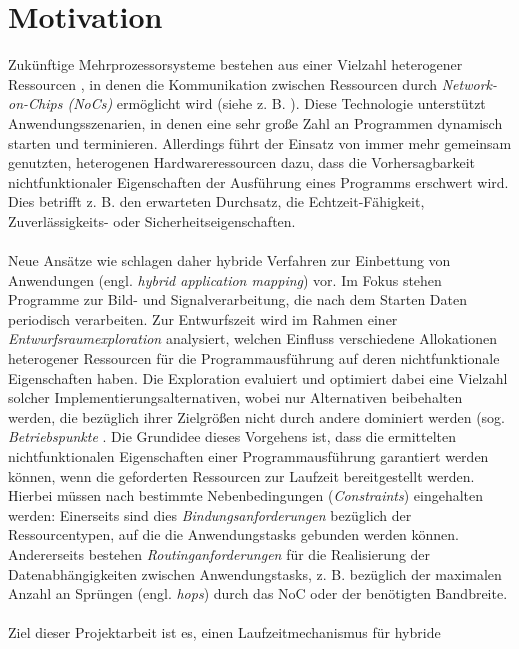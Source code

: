 \chapter{Motivation}\label{motivation}
Zukünftige Mehrprozessorsysteme bestehen aus einer Vielzahl heterogener
Ressourcen \cite{thousandCoreChips}, in denen die Kommunikation zwischen Ressourcen
durch \textit{Network-on-Chips (NoCs)} ermöglicht wird (siehe z. B. \cite{mappingNocArchitectures}). Diese Technologie
unterstützt Anwendungsszenarien, in denen eine sehr große Zahl an Programmen
dynamisch starten und terminieren. Allerdings führt der Einsatz von
immer mehr gemeinsam genutzten, heterogenen Hardwareressourcen dazu, dass
die Vorhersagbarkeit nichtfunktionaler Eigenschaften der Ausführung eines Programms
erschwert wird. Dies betrifft z. B. den erwarteten Durchsatz, die Echtzeit-Fähigkeit, Zuverlässigkeits- oder Sicherheitseigenschaften.\\
\\
Neue Ansätze wie \cite{reconfigurableArchtictures} \cite{daarm} schlagen daher hybride Verfahren zur Einbettung von
Anwendungen (engl. \textit{hybrid application mapping}) vor. Im Fokus stehen Programme
zur Bild- und Signalverarbeitung, die nach dem Starten Daten periodisch
verarbeiten. Zur Entwurfszeit wird im Rahmen einer \textit{Entwurfsraumexploration} analysiert, welchen Einfluss verschiedene Allokationen heterogener
Ressourcen für die Programmausführung auf deren nichtfunktionale Eigenschaften
haben. Die Exploration evaluiert und optimiert dabei eine Vielzahl solcher
Implementierungsalternativen, wobei nur Alternativen beibehalten werden, die
bezüglich ihrer Zielgrößen nicht durch andere dominiert werden (sog. \textit{Betriebspunkte} \cite{runTimeManagement}. Die Grundidee dieses Vorgehens ist, dass die ermittelten nichtfunktionalen
Eigenschaften einer Programmausführung garantiert werden können,
wenn die geforderten Ressourcen zur Laufzeit bereitgestellt werden. Hierbei
müssen nach \cite{daarm}  bestimmte Nebenbedingungen (\textit{Constraints}) eingehalten werden:
Einerseits sind dies \textit{Bindungsanforderungen} bezüglich der Ressourcentypen,
auf die die Anwendungstasks gebunden werden können. Andererseits bestehen
\textit{Routinganforderungen} für die Realisierung der Datenabhängigkeiten zwischen
Anwendungstasks, z. B. bezüglich der maximalen Anzahl an Sprüngen (engl.
\textit{hops}) durch das NoC oder der benötigten Bandbreite.\\
\\
Ziel dieser Projektarbeit ist es, einen Laufzeitmechanismus für hybride
